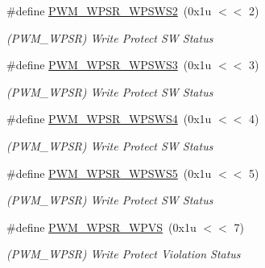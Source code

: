 \begin{DoxyCompactItemize}
\mbox{\label{group__SAMV71__PWM_ga232173f80b5d95a0dc3f3e3ed98973de}} 
\#define \mbox{\hyperlink{group__SAMV71__PWM_ga232173f80b5d95a0dc3f3e3ed98973de}{P\+W\+M\+\_\+\+W\+P\+S\+R\+\_\+\+W\+P\+S\+W\+S2}}~(0x1u $<$$<$ 2)
\begin{DoxyCompactList}\small\item\em (P\+W\+M\+\_\+\+W\+P\+SR) Write Protect SW Status \end{DoxyCompactList}\item 
\mbox{\label{group__SAMV71__PWM_gab2c27c13adebee1cdd31dfe24d11d747}} 
\#define \mbox{\hyperlink{group__SAMV71__PWM_gab2c27c13adebee1cdd31dfe24d11d747}{P\+W\+M\+\_\+\+W\+P\+S\+R\+\_\+\+W\+P\+S\+W\+S3}}~(0x1u $<$$<$ 3)
\begin{DoxyCompactList}\small\item\em (P\+W\+M\+\_\+\+W\+P\+SR) Write Protect SW Status \end{DoxyCompactList}\item 
\mbox{\label{group__SAMV71__PWM_ga5d1554655175492c6bf1cc86448650ef}} 
\#define \mbox{\hyperlink{group__SAMV71__PWM_ga5d1554655175492c6bf1cc86448650ef}{P\+W\+M\+\_\+\+W\+P\+S\+R\+\_\+\+W\+P\+S\+W\+S4}}~(0x1u $<$$<$ 4)
\begin{DoxyCompactList}\small\item\em (P\+W\+M\+\_\+\+W\+P\+SR) Write Protect SW Status \end{DoxyCompactList}\item 
\mbox{\label{group__SAMV71__PWM_ga0768cfcf47672715e0123a7fb345e3c8}} 
\#define \mbox{\hyperlink{group__SAMV71__PWM_ga0768cfcf47672715e0123a7fb345e3c8}{P\+W\+M\+\_\+\+W\+P\+S\+R\+\_\+\+W\+P\+S\+W\+S5}}~(0x1u $<$$<$ 5)
\begin{DoxyCompactList}\small\item\em (P\+W\+M\+\_\+\+W\+P\+SR) Write Protect SW Status \end{DoxyCompactList}\item 
\mbox{\label{group__SAMV71__PWM_ga8d57bf1b1bfac2bf2e2e752c5175df37}} 
\#define \mbox{\hyperlink{group__SAMV71__PWM_ga8d57bf1b1bfac2bf2e2e752c5175df37}{P\+W\+M\+\_\+\+W\+P\+S\+R\+\_\+\+W\+P\+VS}}~(0x1u $<$$<$ 7)
\begin{DoxyCompactList}\small\item\em (P\+W\+M\+\_\+\+W\+P\+SR) Write Protect Violation Status \end{DoxyCompactList}\item 
$$
\end{DoxyCompactItemize}
